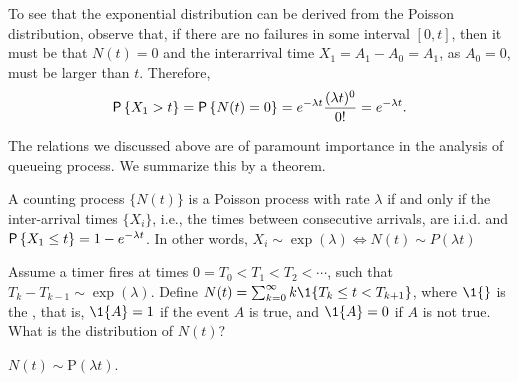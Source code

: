 To see that the exponential distribution can be derived from the Poisson distribution, observe that, if there are no failures in some interval $[0,t]$, then it
must be that $N(t) = 0$ and the interarrival time $X_1=A_1-A_0=A_1$, as
$A_0=0$, must be larger than $t$.  Therefore,
\begin{equation*}
 \P{X_1> t} = \P{N(t) = 0} = e^{-\lambda t} \frac{(\lambda t)^0}{0!}= e^{-\lambda t}.
\end{equation*}

The relations we discussed above are of paramount importance in the
analysis of queueing process. We summarize this by a theorem.
\begin{theorem}\label{thr:1}
  A counting process $\{N(t)\}$ is a Poisson process with rate $\lambda$ if and only if
  the inter-arrival times $\{X_i\}$, i.e., the times between consecutive
  arrivals, are i.i.d. and $\P{ X_1\leq t} = 1 - e^{-\lambda t}$. In other words, $X_i\sim \exp(\lambda) \Leftrightarrow N(t) \sim P(\lambda t)$ 
\end{theorem}



\begin{exercise}
  Assume a timer fires at times $0=T_0<T_1<T_2< \cdots$, such that
  $T_{k}-T_{k-1}\sim\exp(\lambda)$. Define
  $N(t) = \sum_{k=0}^\infty k \1{T_k \leq t < T_{k+1}}$, where $\1{}$
  is the , that is, $\1{A}=1$ if the event
  $A$ is true, and $\1{A}=0$ if $A$ is not true. What is the
  distribution of $N(t)$?
\begin{solution}
$N(t) \sim \text{P}(\lambda t)$. 
\end{solution}
\end{exercise}


